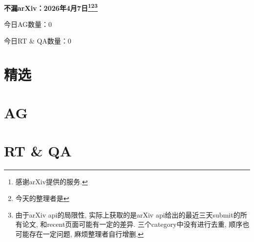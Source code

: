 \documentclass[9pt, a4paper]{article}
\theoremstyle{plain}
\theoremstyle{definition}
\theoremstyle{remark}
\newcommand{\AGnumber}{0}
\newcommand{\RTQAnumber}{0}
\newcommand{\NewestDate}{2026年4月7日}
\newcommand{\todayarXiver}{} %
\begin{document}
\begin{center}
    \Huge\textbf{不漏arXiv：\NewestDate\footnote{感谢arXiv提供的服务.}\footnote{今天的整理者是\todayarXiver}\footnote{由于arXiv api的局限性, 实际上获取的是arXiv api给出的最近三天submit的所有论文, 和recent页面可能有一定的差异. 三个category中没有进行去重, 顺序也可能存在一定问题, 麻烦整理者自行增删.}} \\
\end{center}

\setcounter{section}{-1}

\begin{center}
    今日AG数量：\AGnumber
    
    今日RT \& QA数量：\RTQAnumber
    
\end{center}


\section{精选}


\section{AG}

\section{RT \& QA}
\end{document}
